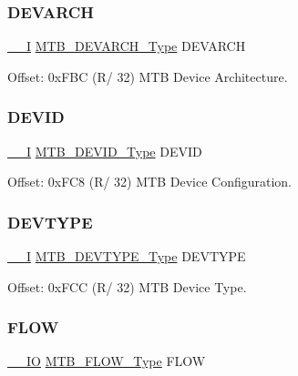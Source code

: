 \subsubsection{\texorpdfstring{DEVARCH}{DEVARCH}}
{\footnotesize\ttfamily \mbox{\hyperlink{core__cm0plus_8h_af63697ed9952cc71e1225efe205f6cd3}{\+\_\+\+\_\+I}} \mbox{\hyperlink{union_m_t_b___d_e_v_a_r_c_h___type}{M\+T\+B\+\_\+\+D\+E\+V\+A\+R\+C\+H\+\_\+\+Type}} D\+E\+V\+A\+R\+CH}



Offset\+: 0x\+F\+BC (R/ 32) M\+TB Device Architecture. 

\mbox{\label{struct_mtb_a8136bd1822f34a8788029bcbb678cfd2}} 
\subsubsection{\texorpdfstring{DEVID}{DEVID}}
{\footnotesize\ttfamily \mbox{\hyperlink{core__cm0plus_8h_af63697ed9952cc71e1225efe205f6cd3}{\+\_\+\+\_\+I}} \mbox{\hyperlink{union_m_t_b___d_e_v_i_d___type}{M\+T\+B\+\_\+\+D\+E\+V\+I\+D\+\_\+\+Type}} D\+E\+V\+ID}



Offset\+: 0x\+F\+C8 (R/ 32) M\+TB Device Configuration. 

\mbox{\label{struct_mtb_aaf244d52b9069c2872dea27edc025daf}} 
\subsubsection{\texorpdfstring{DEVTYPE}{DEVTYPE}}
{\footnotesize\ttfamily \mbox{\hyperlink{core__cm0plus_8h_af63697ed9952cc71e1225efe205f6cd3}{\+\_\+\+\_\+I}} \mbox{\hyperlink{union_m_t_b___d_e_v_t_y_p_e___type}{M\+T\+B\+\_\+\+D\+E\+V\+T\+Y\+P\+E\+\_\+\+Type}} D\+E\+V\+T\+Y\+PE}



Offset\+: 0x\+F\+CC (R/ 32) M\+TB Device Type. 

\mbox{\label{struct_mtb_a3321b65b1f61270bfa17be24d2770d69}} 
\subsubsection{\texorpdfstring{FLOW}{FLOW}}
{\footnotesize\ttfamily \mbox{\hyperlink{core__cm0plus_8h_aec43007d9998a0a0e01faede4133d6be}{\+\_\+\+\_\+\+IO}} \mbox{\hyperlink{union_m_t_b___f_l_o_w___type}{M\+T\+B\+\_\+\+F\+L\+O\+W\+\_\+\+Type}} F\+L\+OW}



